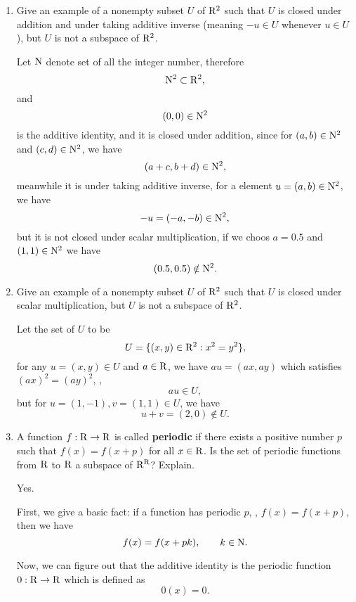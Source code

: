\begin{enumerate}
\begin{solution}
\begin{enumerate}[label=(\alph*)]
            \end{enumerate}
        \end{solution}
    \item Give an example of a nonempty subset $U$ of $\mathrm{R}^2$ such that $U$ is closed under addition 
        and under taking additive inverse (meaning $-u \in U$ whenever $u \in U$), but $U$ is not 
        a subspace of $\mathrm{R}^2$.
        \begin{solution}
            Let $\mathrm{N}$ denote set of all the integer number, therefore 
            \[ \mathrm{N}^2 \subset \mathrm{R}^2 ,\]
            and 
            \[ (0,0) \in \mathrm{N}^2 \]
            is the additive identity, and it is closed under addition, since for $(a,b) \in \mathrm{N}^2$ and $(c,d) \in \mathrm{N}^2$, 
            we have 
            \[ (a+c, b+d) \in \mathrm{N}^2 ,\]
            meanwhile it is under taking additive inverse, for a element $u = (a,b) \in \mathrm{N}^2$, we have 
            \[ -u = (-a,-b) \in \mathrm{N}^2 ,\]
            but it is not closed under scalar multiplication, if we choos $a=0.5$ and $(1,1) \in \mathrm{N}^2$
            we have 
            \[ (0.5, 0.5) \notin \mathrm{N}^2 .\]
        \end{solution}
    \item Give an example of a nonempty subset $U$ of $\mathrm{R}^2$ such that $U$ is closed under scalar multiplication,
        but $U$ is not a subspace of $\mathrm{R}^2$.
        \begin{solution}
            Let the set of $U$ to be 
            \[ U = \{(x,y) \in \mathrm{R}^2: x^2 = y^2\},\]
            for any $u = (x,y) \in U$ and $a \in \mathrm{R}$, 
            we have $au = (ax, ay)$ which satisfies $(ax)^2 = (ay)^2$, \ie, 
            \[ au \in U ,\]
            but for $u=(1,-1), v=(1,1) \in U$, 
            we have 
            \[ u+v = (2,0) \notin U .\]
        \end{solution}
    \item A function $f: \mathrm{R} \to \mathrm{R}$ is called \textbf{periodic} if there exists a positive number $p$ such that 
        $f(x) = f(x+p)$ for all $x \in \mathrm{R}$. Is the set of periodic functions from $\mathrm{R}$ to $\mathrm{R}$
        a subspace of $\mathrm{R}^{\mathrm{R}}$? Explain.
        \begin{solution}
            Yes.

            First, we give a basic fact: if a function has periodic $p$, \ie, $f(x) = f(x+p)$, then we have 
            \[ f(x) = f(x + pk), \qquad k \in \mathrm{N} .\]

            Now, we can figure out that the additive identity is the periodic function $0:\mathrm{R} \to \mathrm{R}$ which is defined as
            \[ 0(x) = 0 .\]


\end{solution}
\end{enumerate}
